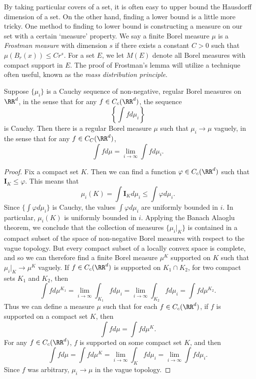 By taking particular covers of a set, it is often easy to upper bound the Hausdorff dimension of a set. On the other hand, finding a lower bound is a little more tricky. One method to finding to lower bound is constructing a measure on our set with a certain `measure' property. We say a finite Borel measure $\mu$ is a \emph{Frostman measure} with dimension $s$ if there exists a constant $C > 0$ such that $\mu(B_r(x)) \leq C r^s$. For a set $E$, we let $M(E)$ denote all Borel measures with compact support in $E$. The proof of Frostman's lemma will utilize a technique often useful, known as the \emph{mass distribution principle}.

\begin{lemma} \label{weakstarcompleteness}
	Suppose $\{ \mu_i \}$ is a Cauchy sequence of non-negative, regular Borel measures on $\RR^d$, in the sense that for any $f \in C_c(\RR^d)$, the sequence
	\[ \left\{ \int f d\mu_i \right\} \]
	is Cauchy. Then there is a regular Borel measure $\mu$ such that $\mu_i \to \mu$ vaguely, in the sense that for any $f \in C_C(\RR^d)$,
	\[ \int f d\mu = \lim_{i \to \infty} \int f d\mu_i. \]
\end{lemma}
\begin{proof}
	Fix a compact set $K$. Then we can find a function $\varphi \in C_c(\RR^d)$ such that $\mathbf{I}_K \leq \varphi$. This means that
	\[ \mu_i(K) = \int \mathbf{I}_K d\mu_i \leq \int \varphi d\mu_i. \]
	Since $\{ \int \varphi d\mu_i \}$ is Cauchy, the values $\int \varphi d\mu_i$ are uniformly bounded in $i$. In particular, $\mu_i(K)$ is uniformly bounded in $i$. Applying the Banach Alaoglu theorem, we conclude that the collection of measures $\{ \mu_i|_K \}$ is contained in a compact subset of the space of non-negative Borel measures with respect to the vague topology. But every compact subset of a locally convex space is complete, and so we can therefore find a finite Borel measure $\mu^K$ supported on $K$ such that $\mu_i|_K \to \mu^K$ vaguely. If $f \in C_c(\RR^d)$ is supported on $K_1 \cap K_2$, for two compact sets $K_1$ and $K_2$, then
	\[ \int f d\mu^{K_1} = \lim_{i \to \infty} \int_{K_1} f d\mu_i = \lim_{i \to \infty} \int_{K_2} f d \mu_i = \int f d\mu^{K_2}. \]
	Thus we can define a measure $\mu$ such that for each $f \in C_c(\RR^d)$, if $f$ is supported on a compact set $K$, then
	\[ \int f d\mu = \int f d\mu^K. \]
	For any $f \in C_c(\RR^d)$, $f$ is supported on some compact set $K$, and then
	\[ \int f d\mu = \int f d\mu^K = \lim_{i \to \infty} \int_K f d\mu_i = \lim_{i \to \infty} \int f d\mu_i. \]
	Since $f$ was arbitrary, $\mu_i \to \mu$ in the vague topology.
\end{proof}

